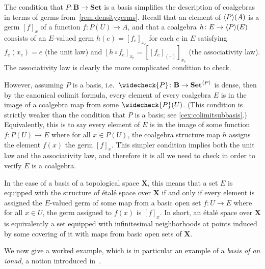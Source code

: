 \documentclass[11pt, oneside, article]{memoir}
\theoremstyle{plain}
\theoremstyle{definition}
\theoremstyle{remark}
\newenvironment{remark}
{\renewcommand\qedsymbol{$\lrcorner$}%
  \pushQED{\qed}\myremark}
{\popQED\endmyremark}
\DeclarePairedDelimiter{\gen}{\langle}{\rangle}
\newcommand{\dash}{{\mathord{\text{--}}}}
\newcommand{\namedcat}[1]{\mathbf{#1}}
\newcommand{\cat}[1]{\mathbf{#1}}
\newcommand{\spa}[1]{\mathbf{#1}}
\newcommand{\Set}{\namedcat{Set}}
\newcommand{\CoalgOn}[2]{{#2}^{#1}}
\newcommand{\CoalgSet}[1]{\CoalgOn{#1}{\Set}}
\newcommand{\lift}[1]{\widecheck{#1}}
\newcommand{\ph}[1]{#1}
\newcommand{\eE}{E}
\newcommand{\xA}{A}
\newcommand{\xU}{U}
\newcommand{\hH}{h}
\newcommand{\bB}{\cat{B}}
\newcommand{\pP}{\ph{P}}
\newcommand{\cP}{\gen{\pP}}
\newcommand{\lP}{\lift{\pP}}
\newcommand{\tX}{\spa{X}}
\newcommand{\PSet}{\CoalgSet{\cP}}
\newcommand{\anoteNI}[1]{}
\begin{document}
\anoteNI{Can the assumptions be weakened? And does this also work for
  some notion of ``coreflexive-equalizer-flatness'', more general than
  coreflexive-equalizer-preservation?}

\begin{remark}\label{rem:simplergerms}
  The condition that $\pP \colon \bB \to \Set$ is a basis simplifies
  the description of coalgebras in terms of germs
  from~\cref{rem:densitygerms}. Recall that an element of $\cP(\xA)$
  is a germ $[f]_x$ of a function $f \colon \pP(\xU) \to \xA$, and
  that a coalgebra $\hH \colon \eE \to \cP(\eE)$ consists of an
  $\eE$-valued germ $\hH(e) = [f_e]_{x_e}$ for each $e$ in $\eE$
  satisfying $f_e(x_e) = e$ (the unit law) and
  $[\hH \circ f_e]_{x_e} = [[f_e]_{(\dash)}]_{x_e}$ (the associativity
  law). The associativity law is clearly the more complicated
  condition to check.

  However, assuming $\pP$ is a basis, i.e.\ $\lP \colon \bB \to \PSet$
  is dense, then by the canonical colimit formula, every element of
  every coalgebra $\eE$ is in the image of a coalgebra map from some
  $\lP(\xU)$. (This condition is strictly weaker than the condition
  that $\pP$ is a basis; see \cref{cex:colimitsubbasis}.)
  Equivalently, this is to say every element of $\eE$ is in the image
  of some function $f \colon \pP(\xU) \to \eE$ where for all
  $x \in \pP(\xU)$, the coalgebra structure map $\hH$ assigns the
  element $f(x)$ the germ $[f]_{x}$. This simpler condition implies
  both the unit law and the associativity law, and therefore it is all
  we need to check in order to verify $\eE$ is a coalgebra.

  In the case of a basis of a topological space $\tX$, this means that
  a set $\eE$ is equipped with the structure of \'etal\'e space over
  $\tX$ if and only if every element is assigned the $\eE$-valued germ
  of some map from a basic open set $f \colon U \to \eE$ where for all
  $x \in U$, the germ assigned to $f(x)$ is $[f]_x$. In short, an
  \'etal\'e space over $\tX$ is equivalently a set equipped with
  infinitesimal neighborhoods at points induced by some covering of it
  with maps from basic open sets of $\tX$.
\end{remark}

We now give a worked example, which is in particular an example of a
\emph{basis of an ionad}, a notion introduced in~\cite{garner:ionads}.
\end{document}
